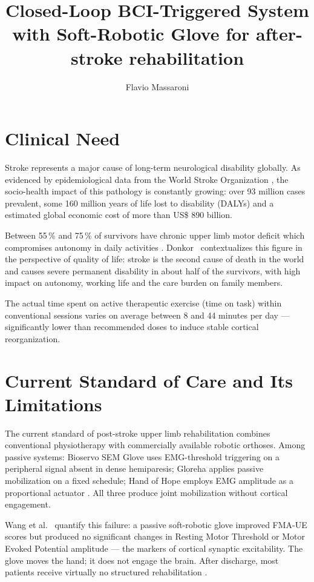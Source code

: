 \documentclass[11pt,a4paper]{article}
\begin{document}
\title{Closed-Loop BCI-Triggered System with Soft-Robotic Glove for after-stroke rehabilitation}
\author{Flavio Massaroni}
\date{}

\maketitle

\section{Clinical Need}
Stroke represents a major cause of long-term neurological disability globally. 
As evidenced by epidemiological data from the World Stroke Organization \cite{feigin2025world}, the socio-health impact of
this pathology is constantly growing: over 93 million cases prevalent, some 160 million years of life lost to disability
(DALYs) and a estimated global economic cost of more than US\$ 890 billion. 

Between 55\,\% and 75\,\% of survivors have chronic upper limb 
motor deficit which compromises autonomy in daily 
activities \cite{proietti2024combining}. Donkor~\cite{donkor2018stroke} 
contextualizes this figure in the perspective of quality of 
life: stroke is the second cause of death in the world and 
causes severe permanent disability in about half of the 
survivors, with high impact on autonomy, working life and 
the care burden on family members.

The actual time spent on active therapeutic exercise (time on task) within conventional
sessions varies on average between 8 and 44 minutes per day \cite{newton2023dose} — significantly lower than recommended doses to 
induce stable cortical reorganization.

\section{Current Standard of Care and Its Limitations}

The current standard of post-stroke upper limb rehabilitation combines 
conventional physiotherapy with commercially available robotic orthoses. 
Among passive systems: Bioservo SEM Glove uses EMG-threshold triggering 
on a peripheral signal absent in dense hemiparesis; Gloreha applies 
passive mobilization on a fixed schedule; Hand of Hope employs EMG 
amplitude as a proportional actuator \cite{fiska2025integration}. All 
three produce joint mobilization without cortical engagement.

Wang et al.~\cite{wang2023effectiveness} quantify this failure: a passive 
soft-robotic glove improved FMA-UE scores but produced no significant 
changes in Resting Motor Threshold or Motor Evoked Potential amplitude --- 
the markers of cortical synaptic excitability. The glove moves the hand; 
it does not engage the brain. After discharge, most patients receive 
virtually no structured rehabilitation \cite{newton2023dose}.
\end{document}
